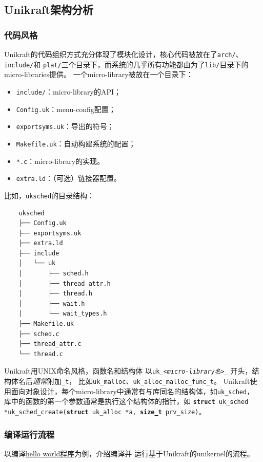 \documentclass{../runikraft-report}
\begin{document}
\subsection{Unikraft架构分析}\vspace*{-4ex}
\subsubsection{代码风格}\label{ssubsec:code-style}
Unikraft的代码组织方式充分体现了模块化设计，核心代码被放在了\texttt{arch/}、\texttt{include/}和
\texttt{plat/}三个目录下，而系统的几乎所有功能都由为了\texttt{lib/}目录下的micro-libraries提供。
一个micro-library被放在一个目录下：
\begin{itemize}
\item \texttt{include/}：micro-library的API；
\item \texttt{Config.uk}：menu-config配置；
\item \texttt{exportsyms.uk}：导出的符号；
\item \texttt{Makefile.uk}：自动构建系统的配置；
\item \texttt{*.c}：micro-library的实现。
\item \texttt{extra.ld}：（可选）链接器配置。
\end{itemize}

比如，\texttt{uksched}的目录结构：
{\linespread{1}
\begin{verbatim}
    uksched
    ├── Config.uk
    ├── exportsyms.uk
    ├── extra.ld
    ├── include
    │   └── uk
    │       ├── sched.h
    │       ├── thread_attr.h
    │       ├── thread.h
    │       ├── wait.h
    │       └── wait_types.h
    ├── Makefile.uk
    ├── sched.c
    ├── thread_attr.c
    └── thread.c
\end{verbatim}}

Unikraft用UNIX命名风格，函数名和结构体
以\texttt{uk\_\hspace{0cm}\textit{<micro-library\hspace{0cm}名\hspace{0cm}>}\hspace{0cm}\_}
开头，结构体名后\textit{通常}附加\texttt{\_t}，
比如\texttt{uk\_malloc}、\texttt{uk\_alloc\_malloc\_func\_t}。
Unikraft使用面向对象设计，每个micro-library中通常有与库同名的结构体，如\texttt{uk\_sched}，
库中的函数的第一个参数通常是执行这个结构体的指针，如
\texttt{\textbf{struct} uk\_sched *uk\_sched\_create(\textbf{struct} uk\_alloc *a, \textbf{size\_t} prv\_size)}。

\subsubsection{编译运行流程}
以编译\href{https://github.com/unikraft/app-helloworld}{hello world程序}为例，介绍编译并
运行基于Unikraft的unikernel的流程。
\end{document}
